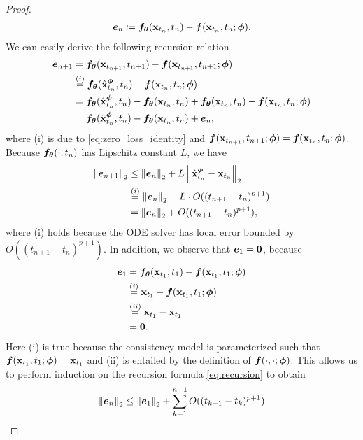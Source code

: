 \begin{appendices}
\begin{proof}
\begin{align*}
        {\bm{e}}_{n} \coloneqq {\bm{f}}_{\bm{\theta}}({\mathbf{x}}_{t_{n}}, t_{n}) - {\bm{f}}({\mathbf{x}}_{t_n}, t_n; {\bm{\phi}}).
    \end{align*}
    We can easily derive the following recursion relation
    \begin{align}
        {\bm{e}}_{n+1} &= {\bm{f}}_{\bm{\theta}}({\mathbf{x}}_{t_{n+1}}, t_{n+1}) - {\bm{f}}({\mathbf{x}}_{t_{n+1}}, t_{n+1}; {\bm{\phi}})\notag\\
        &\stackrel{(i)}{=} {\bm{f}}_{\bm{\theta}}(\hat{{\mathbf{x}}}_{t_{n}}^{\bm{\phi}}, t_{n}) - {\bm{f}}({\mathbf{x}}_{t_{n}}, t_{n}; {\bm{\phi}})\notag\\
        &= {\bm{f}}_{\bm{\theta}}(\hat{{\mathbf{x}}}_{t_{n}}^{\bm{\phi}}, t_{n}) - {\bm{f}}_{\bm{\theta}}({\mathbf{x}}_{t_n}, t_n) + {\bm{f}}_{\bm{\theta}}({\mathbf{x}}_{t_n}, t_n) - {\bm{f}}({\mathbf{x}}_{t_{n}}, t_{n}; {\bm{\phi}})\notag\\
        &= {\bm{f}}_{\bm{\theta}}(\hat{{\mathbf{x}}}_{t_{n}}^{\bm{\phi}}, t_{n}) - {\bm{f}}_{\bm{\theta}}({\mathbf{x}}_{t_n}, t_n) + {\bm{e}}_{n},\label{eq:recursion}
    \end{align}
    where (i) is due to \cref{eq:zero_loss_identity} and ${\bm{f}}({\mathbf{x}}_{t_{n+1}}, t_{n+1}; {\bm{\phi}}) =  {\bm{f}}({\mathbf{x}}_{t_{n}}, t_{n}; {\bm{\phi}})$. Because ${\bm{f}}_{\bm{\theta}}(\cdot, t_n)$ has Lipschitz constant $L$, we have
    \begin{align*}
        \left\lVert{\bm{e}}_{n+1}\right\rVert_2 &\leq \left\lVert{\bm{e}}_{n}\right\rVert_2 + L \left\lVert\hat{{\mathbf{x}}}_{t_n}^{\bm{\phi}} - {\mathbf{x}}_{t_n}\right\rVert_2\\
        &\stackrel{(i)}{=}  \left\lVert{\bm{e}}_{n}\right\rVert_2 + L\cdot O((t_{n+1} - t_n)^{p+1})\\
        &=\left\lVert{\bm{e}}_{n}\right\rVert_2 + O((t_{n+1} - t_n)^{p+1}),
    \end{align*}
    where (i) holds because the ODE solver has local error bounded by $O((t_{n+1}-t_n)^{p+1})$. In addition, we observe that ${\bm{e}}_1 = \bm{0}$, because
    \begin{align*}
        {\bm{e}}_1 &= {\bm{f}}_{\bm{\theta}}({\mathbf{x}}_{t_1}, t_1) - {\bm{f}}({\mathbf{x}}_{t_1}, t_1; {\bm{\phi}}) \\
        &\stackrel{(i)}{=} {\mathbf{x}}_{t_1} - {\bm{f}}({\mathbf{x}}_{t_1}, t_1; {\bm{\phi}})\\
        &\stackrel{(ii)}{=} {\mathbf{x}}_{t_1} - {\mathbf{x}}_{t_1}\\
        &= \bm{0}.
    \end{align*}
    Here (i) is true because the consistency model is parameterized such that ${\bm{f}}({\mathbf{x}}_{t_1}, t_1; {\bm{\phi}}) = {\mathbf{x}}_{t_1}$ and (ii) is entailed by the definition of ${\bm{f}}(\cdot, \cdot; {\bm{\phi}})$. This allows us to perform induction on the recursion formula \cref{eq:recursion} to obtain
    \begin{align*}
        \norm{\ve_{n}}_2 &\leq \norm{\ve_{1}}_2 + \sum_{k=1}^{n-1} O((t_{k+1} - t_k)^{p+1}) \\

\end{align*}
\end{proof}
\end{appendices}
